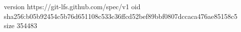 version https://git-lfs.github.com/spec/v1
oid sha256:b05b92454c5b76d651108c533c36ffcd52bef89bbf0807dccaca476ae85158c5
size 354483
